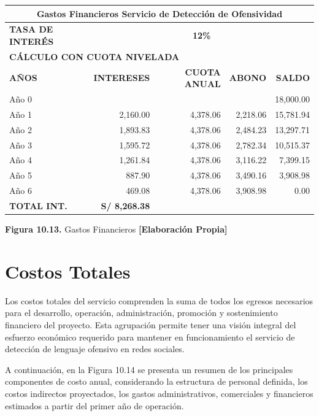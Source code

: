 \begin{table}[H]
\centering
\scriptsize
\renewcommand{\arraystretch}{1.15}
\setlength{\tabcolsep}{5pt}
\begin{tabular}{|l|r|r|r|r|}
\hline
\multicolumn{5}{|c|}{\textbf{Gastos Financieros Servicio de Detección de Ofensividad}} \\ \hline
\textbf{TASA DE INTERÉS} & \multicolumn{4}{c|}{\textbf{12\%}} \\ \hline
\multicolumn{5}{|l|}{\textbf{CÁLCULO CON CUOTA NIVELADA}} \\ \hline
\textbf{AÑOS} & \textbf{INTERESES} & \textbf{CUOTA ANUAL} & \textbf{ABONO} & \textbf{SALDO} \\ \hline
Año 0 &  &  &  & 18,000.00 \\ \hline
Año 1 & 2,160.00 & 4,378.06 & 2,218.06 & 15,781.94 \\ \hline
Año 2 & 1,893.83 & 4,378.06 & 2,484.23 & 13,297.71 \\ \hline
Año 3 & 1,595.72 & 4,378.06 & 2,782.34 & 10,515.37 \\ \hline
Año 4 & 1,261.84 & 4,378.06 & 3,116.22 & 7,399.15 \\ \hline
Año 5 & 887.90 & 4,378.06 & 3,490.16 & 3,908.98 \\ \hline
Año 6 & 469.08 & 4,378.06 & 3,908.98 & 0.00 \\ \hline
\textbf{TOTAL INT.} & \textbf{S/ 8,268.38} &  &  &  \\ \hline
\end{tabular}

\vspace{0.2cm}
\textbf{Figura 10.13.} Gastos Financieros \textbf{[Elaboración Propia]}
\end{table}

\section{Costos Totales}

Los costos totales del servicio comprenden la suma de todos los egresos necesarios para el desarrollo, operación, administración, promoción y sostenimiento financiero del proyecto. Esta agrupación permite tener una visión integral del esfuerzo económico requerido para mantener en funcionamiento el servicio de detección de lenguaje ofensivo en redes sociales.

A continuación, en la Figura 10.14 se presenta un resumen de los principales componentes de costo anual, considerando la estructura de personal definida, los costos indirectos proyectados, los gastos administrativos, comerciales y financieros estimados a partir del primer año de operación.

